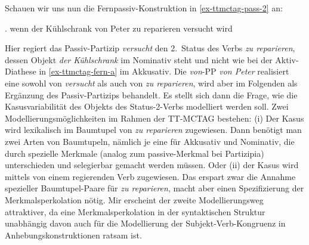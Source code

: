 Schauen wir uns nun die Fernpassiv-Konstruktion in \ref{ex-ttmctag-pass-2} an:\largerpage%

\ex. \label{ex-ttmctag-pass-2} wenn der Kühlschrank von Peter zu reparieren versucht wird

Hier regiert das Passiv-Partizip {\it versucht} den 2.~Status des Verbs {\it zu reparieren}, dessen Objekt {\it der Kühlschrank} im Nominativ steht und nicht wie bei der Aktiv-Diathese in \ref{ex-ttmctag-fern-a} im Akkusativ. Die \emph{von}-PP {\it von Peter} realisiert eine  sowohl von {\it versucht} als auch von {\it zu reparieren}, wird aber im Folgenden als Ergänzung des Passiv-Partizips behandelt. Es stellt sich dann die Frage, wie die Kasusvariabilität des Objekts des Status-2-Verbs modelliert werden soll. Zwei Modellierungsmöglichkeiten im Rahmen der TT-MCTAG bestehen: (i) Der Kasus wird lexikalisch im Baumtupel von {\it zu reparieren} zugewiesen. Dann benötigt man zwei Arten von Baumtupeln, nämlich je eine für Akkusativ und Nominativ, die durch spezielle Merkmale (analog zum {\sc passive}-Merkmal bei Partizipia) unterschieden und selegierbar gemacht werden müssen. Oder (ii) der Kasus wird mittels  von einem regierenden Verb zugewiesen. Das erspart zwar die Annahme spezieller Baumtupel-Paare für {\it zu reparieren}, macht aber einen Spezifizierung der Merkmalsperkolation nötig. Mir erscheint der zweite Modellierungsweg attraktiver, da eine Merkmalsperkolation in der syntaktischen Struktur unabhängig davon auch für die Modellierung der Subjekt-Verb-Kongruenz in Anhebungskonstruktionen ratsam ist.
\largerpage%

